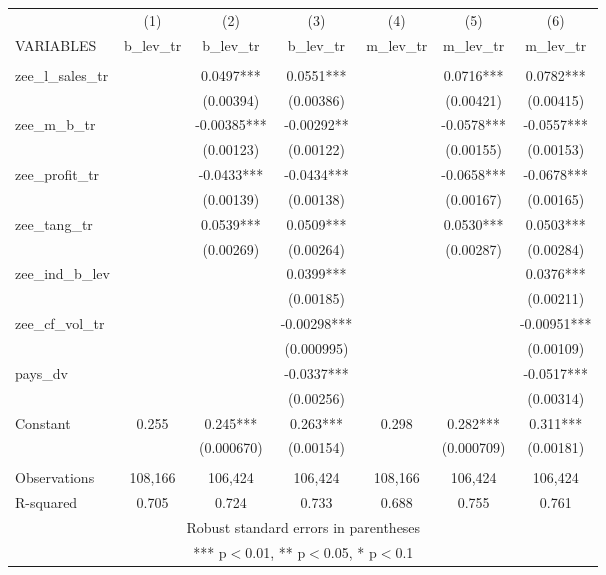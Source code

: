 \begin{tabular}{lcccccc} \hline
 & (1) & (2) & (3) & (4) & (5) & (6) \\
VARIABLES & b\_lev\_tr & b\_lev\_tr & b\_lev\_tr & m\_lev\_tr & m\_lev\_tr & m\_lev\_tr \\ \hline
 &  &  &  &  &  &  \\
zee\_l\_sales\_tr &  & 0.0497*** & 0.0551*** &  & 0.0716*** & 0.0782*** \\
 &  & (0.00394) & (0.00386) &  & (0.00421) & (0.00415) \\
zee\_m\_b\_tr &  & -0.00385*** & -0.00292** &  & -0.0578*** & -0.0557*** \\
 &  & (0.00123) & (0.00122) &  & (0.00155) & (0.00153) \\
zee\_profit\_tr &  & -0.0433*** & -0.0434*** &  & -0.0658*** & -0.0678*** \\
 &  & (0.00139) & (0.00138) &  & (0.00167) & (0.00165) \\
zee\_tang\_tr &  & 0.0539*** & 0.0509*** &  & 0.0530*** & 0.0503*** \\
 &  & (0.00269) & (0.00264) &  & (0.00287) & (0.00284) \\
zee\_ind\_b\_lev &  &  & 0.0399*** &  &  & 0.0376*** \\
 &  &  & (0.00185) &  &  & (0.00211) \\
zee\_cf\_vol\_tr &  &  & -0.00298*** &  &  & -0.00951*** \\
 &  &  & (0.000995) &  &  & (0.00109) \\
pays\_dv &  &  & -0.0337*** &  &  & -0.0517*** \\
 &  &  & (0.00256) &  &  & (0.00314) \\
Constant & 0.255 & 0.245*** & 0.263*** & 0.298 & 0.282*** & 0.311*** \\
 &  & (0.000670) & (0.00154) &  & (0.000709) & (0.00181) \\
 &  &  &  &  &  &  \\
Observations & 108,166 & 106,424 & 106,424 & 108,166 & 106,424 & 106,424 \\
 R-squared & 0.705 & 0.724 & 0.733 & 0.688 & 0.755 & 0.761 \\ \hline
\multicolumn{7}{c}{ Robust standard errors in parentheses} \\
\multicolumn{7}{c}{ *** p$<$0.01, ** p$<$0.05, * p$<$0.1} \\
\end{tabular}
